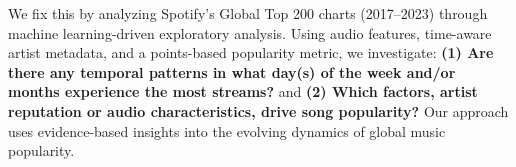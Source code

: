 \documentclass{article}
\begin{document}
We fix this by analyzing Spotify's Global Top 200 charts (2017–2023) through machine learning-driven exploratory analysis. Using audio features, time-aware artist metadata, and a points-based popularity metric, we investigate: \textbf{(1) Are there any temporal patterns in what day(s) of the week and/or months experience the most streams?} and \textbf{(2) Which factors, artist reputation or audio characteristics, drive song popularity?} Our approach uses evidence-based insights into the evolving dynamics of global music popularity.


\end{document}
